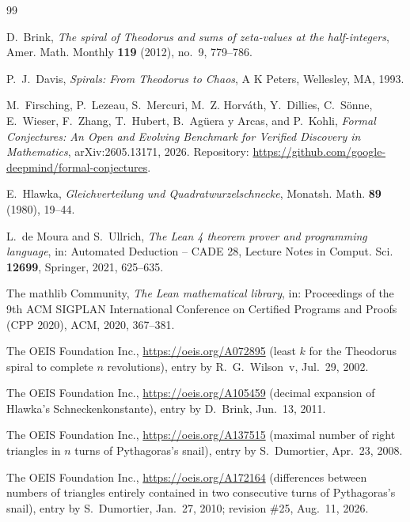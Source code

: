 \documentclass[11pt]{amsart}
\theoremstyle{plain}
\theoremstyle{definition}
\begin{document}
{\footnotesize
\begin{thebibliography}{99}

D.~Brink, \emph{The spiral of Theodorus and sums of zeta-values at the half-integers}, Amer. Math. Monthly \textbf{119} (2012), no.~9, 779--786.

P.~J.~Davis, \emph{Spirals: From Theodorus to Chaos}, A K Peters, Wellesley, MA, 1993.

M.~Firsching, P.~Lezeau, S.~Mercuri, M.~Z. Horv\'ath, Y.~Dillies, C.~S\"onne, E.~Wieser, F.~Zhang, T.~Hubert, B.~Ag\"uera y Arcas, and P.~Kohli, \emph{Formal Conjectures: An Open and Evolving Benchmark for Verified Discovery in Mathematics}, arXiv:2605.13171, 2026. Repository: \url{https://github.com/google-deepmind/formal-conjectures}.

E.~Hlawka, \emph{Gleichverteilung und Quadratwurzelschnecke}, Monatsh. Math. \textbf{89} (1980), 19--44.

L.~de Moura and S.~Ullrich, \emph{The Lean 4 theorem prover and programming language}, in: Automated Deduction -- CADE 28, Lecture Notes in Comput. Sci. \textbf{12699}, Springer, 2021, 625--635.

The mathlib Community, \emph{The Lean mathematical library}, in: Proceedings of the 9th ACM SIGPLAN International Conference on Certified Programs and Proofs (CPP 2020), ACM, 2020, 367--381.

The OEIS Foundation Inc., \url{https://oeis.org/A072895} (least $k$ for the Theodorus spiral to complete $n$ revolutions), entry by R.~G.~Wilson~v, Jul.~29, 2002.

The OEIS Foundation Inc., \url{https://oeis.org/A105459} (decimal expansion of Hlawka's Schneckenkonstante), entry by D.~Brink, Jun.~13, 2011.

The OEIS Foundation Inc., \url{https://oeis.org/A137515} (maximal number of right triangles in $n$ turns of Pythagoras's snail), entry by S.~Dumortier, Apr.~23, 2008.

The OEIS Foundation Inc., \url{https://oeis.org/A172164} (differences between numbers of triangles entirely contained in two consecutive turns of Pythagoras's snail), entry by S.~Dumortier, Jan.~27, 2010; revision \#25, Aug.~11, 2026.

\end{thebibliography}
}
\end{document}
